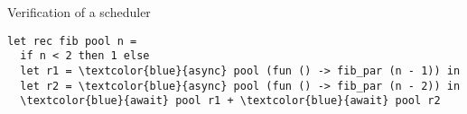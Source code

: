 \begin{frame}[fragile]{Verification of a scheduler}
\begin{Verbatim}[commandchars=\\\{\}]
let rec fib pool n =
  if n < 2 then 1 else
  let r1 = \textcolor{blue}{async} pool (fun () -> fib_par (n - 1)) in
  let r2 = \textcolor{blue}{async} pool (fun () -> fib_par (n - 2)) in
  \textcolor{blue}{await} pool r1 + \textcolor{blue}{await} pool r2
\end{Verbatim}
\end{frame}